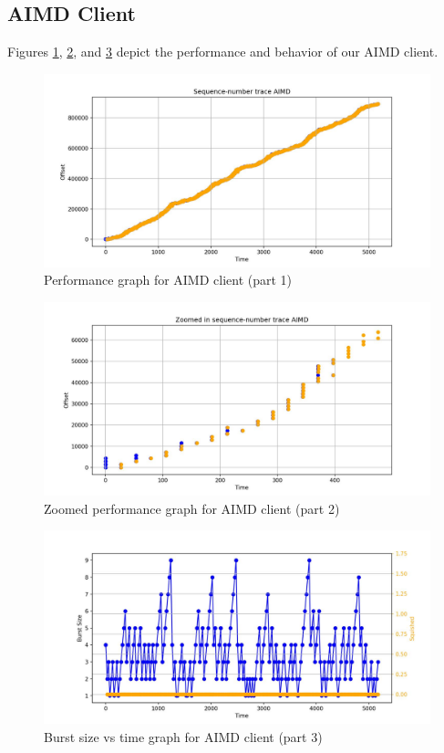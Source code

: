 \documentclass[12pt]{article}
\begin{document}
\subsection{AIMD Client}

Figures \ref{fig:aimd1}, \ref{fig:aimd2}, and \ref{fig:aimd3} depict the performance and behavior of our AIMD client.


\begin{figure}[h]
    \centering
    \includegraphics[width=0.7\linewidth]{AIMD_1.jpeg}
    \caption{Performance graph for AIMD client (part 1)}
    \label{fig:aimd1}
\end{figure}

\begin{figure}[h]
    \centering
    \includegraphics[width=0.7\linewidth]{AIMD_2.jpeg}
    \caption{Zoomed performance graph for AIMD client (part 2)}
    \label{fig:aimd2}
\end{figure}

\begin{figure}[h]
    \centering
    \includegraphics[width=0.7\linewidth]{AIMD_3.jpeg}
    \caption{Burst size vs time graph for AIMD client (part 3)}
    \label{fig:aimd3}
\end{figure}
\end{document}
